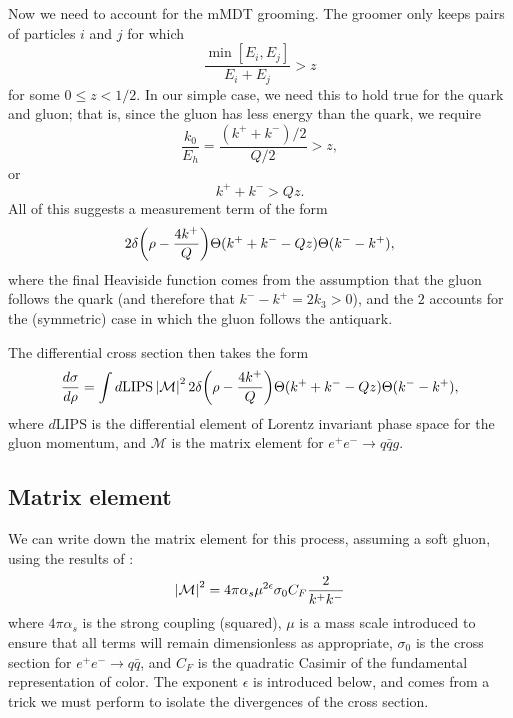\documentclass[11pt,twoside,reqno]{amsart}
\theoremstyle{plain}
\theoremstyle{remark}
\theoremstyle{definition}
\theoremstyle{remark}
\theoremstyle{definition}
\theoremstyle{definition}
\newcommand{\cM}{\mathcal{M}}
\newcommand{\LIPS}{\mathrm{LIPS}}
\begin{document}
	Now we need to account for the mMDT grooming. The groomer only keeps pairs of particles $i$ and $j$ for which \cite{kardos_two-_2020}
	\begin{equation}
		\frac{\min[E_i, E_j]}{E_i + E_j} > z
	\end{equation}
	for some $0 \le z < 1/2$. In our simple case, we need this to hold true for the quark and gluon; that is, since the gluon has less energy than the quark, we require
	\begin{equation}
		\frac{k_0}{E_h} = \frac{(k^+ + k^-)/2}{Q/2} > z,
	\end{equation}
	or
	\begin{equation}
		k^+ + k^- > Q z.
	\end{equation}
	All of this suggests a measurement term of the form
	\begin{equation}
		2\delta\qty(\rho - \frac{4 k^+}{Q})\Theta(k^+ + k^- - Qz)\Theta(k^- - k^+),
	\end{equation}
	where the final Heaviside function comes from the assumption that the gluon follows the quark (and therefore that $k^- - k^+ = 2k_3 > 0$), and the $2$ accounts for the (symmetric) case in which the gluon follows the antiquark.

	The differential cross section then takes the form
	\begin{equation}\label{eq:cross section}
	\begin{aligned}
		\frac{d\sigma}{d\rho} = \int d\LIPS\,\abs{\cM}^2 \, 2\delta\qty(\rho - \frac{4 k^+}{Q})\Theta(k^+ + k^- - Qz)\Theta(k^- - k^+),
	\end{aligned}
	\end{equation}
	where $d\LIPS$ is the differential element of Lorentz invariant phase space for the gluon momentum, and $\cM$ is the matrix element for $e^+ e^- \to q\bar q g$.

\subsection{Matrix element}

	We can write down the matrix element for this process, assuming a soft gluon, using the results of \cite{catani_infrared_2000}:
	\begin{equation}\label{eq:matrix element}
		\abs{\cM}^2 = 4 \pi \alpha_s \mu^{2\epsilon} \sigma_0 C_F \frac{2}{k^+ k^-}
	\end{equation}
	where $4\pi\alpha_s$ is the strong coupling (squared), $\mu$ is a mass scale introduced to ensure that all terms will remain dimensionless as appropriate, $\sigma_0$ is the cross section for $e^+ e^- \to q \bar q$, and $C_F$ is the quadratic Casimir of the fundamental representation of color. The exponent $\epsilon$ is introduced below, and comes from a trick we must perform to isolate the divergences of the cross section.
\end{document}
